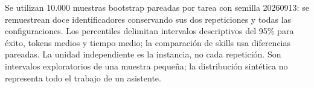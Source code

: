 Se utilizan 10.000 muestras bootstrap pareadas por tarea con semilla 20260913: se remuestrean doce identificadores conservando sus dos repeticiones y todas las configuraciones. Los percentiles delimitan intervalos descriptivos del 95\% para éxito, tokens medios y tiempo medio; la comparación de skills usa diferencias pareadas. La unidad independiente es la instancia, no cada repetición. Son intervalos exploratorios de una muestra pequeña; la distribución sintética no representa todo el trabajo de un asistente.
